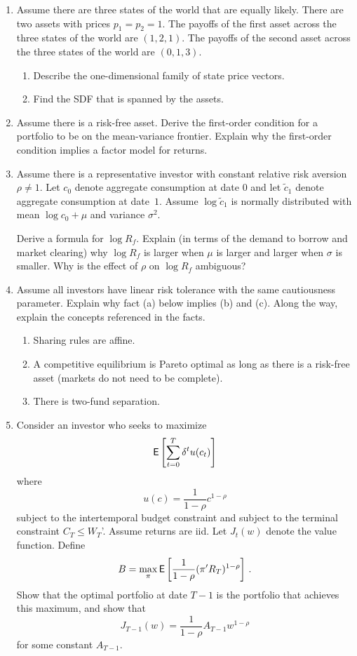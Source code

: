 \begin{enumerate}
\item Assume there are three states of the world that are equally likely.  There are two assets with prices $p_1=p_2=1$.  The payoffs of the first asset across the three states of the world are $(1,2,1)$.  The payoffs of the second asset across the three states of the world are $(0,1,3)$.  
\begin{enumerate}
\item Describe the one-dimensional family of state price vectors.
\item Find the SDF that is spanned by the assets.
\end{enumerate}

\newpage\item Assume there is a risk-free asset.  Derive the first-order condition for a portfolio to be on the mean-variance frontier.  Explain why the first-order condition implies a factor model for returns.

\newpage\item  Assume there is a representative investor with constant relative risk aversion $\rho \neq 1$.  Let $c_0$ denote aggregate consumption at date 0 and let $\tilde{c}_1$ denote aggregate consumption at date~$1$.  Assume $\log \tilde{c}_1$ is normally distributed with mean $\log c_0 + \mu$ and variance $\sigma^2$.  
\begin{enumerate}
\im Derive a formula for $\log R_f$.  
\im Explain (in terms of the demand to borrow and market clearing) why $\log R_f$ is larger when $\mu$ is larger and larger when $\sigma$ is smaller.
\im Why is the effect of $\rho$ on $\log R_f$ ambiguous?
\end{enumerate}

\newpage\item Assume all investors have linear risk tolerance with the same cautiousness parameter.  Explain why fact (a) below implies (b) and (c).  Along the way, explain the concepts referenced in the facts.
\begin{enumerate}
\item Sharing rules are affine.
\item A competitive equilibrium is Pareto optimal as long as there is a risk-free asset (markets do not need to be complete).
\item There is two-fund separation.
\end{enumerate}



\newpage\item Consider an investor who seeks to maximize
$$\mathsf{E} \left[\sum_{t=0}^T \delta^t u(c_t)\right]$$
where
$$u(c) = \frac{1}{1-\rho}c^{1-\rho}$$
subject to the intertemporal budget constraint and subject to the terminal constraint $C_T \leq W_T$'.  Assume returns are iid.  Let $J_t(w)$ denote the value function. Define
$$B = \max_\pi \mathsf{E}\left[\frac{1}{1-\rho}(\pi'R_T)^{1-\rho}\right]\,.$$
Show that the optimal portfolio at date $T-1$ is the portfolio that achieves this maximum, and show that
$$J_{T-1}(w) = \frac{1}{1-\rho}A_{T-1}w^{1-\rho}$$
for some constant $A_{T-1}$.


\end{enumerate}
